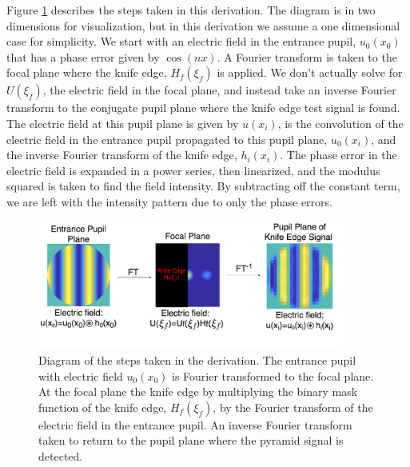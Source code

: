  Figure \ref{fig:derivationFlow} describes the steps taken in this derivation. The diagram is in two dimensions for visualization, but in this derivation we assume a one dimensional case for simplicity. We start with an electric field in the entrance pupil, $u_0(x_0)$ that has a phase error given by $\cos(nx)$. A Fourier transform is taken to the focal plane where the knife edge, $H_f(\xi_f)$ is applied. We don't actually solve for $U(\xi_f)$, the electric field in the focal plane, and instead take an inverse Fourier transform to the conjugate pupil plane where the knife edge test signal is found. The electric field at this pupil plane is given by $u(x_i)$, is the convolution of the electric field in the entrance pupil propagated to this pupil plane, $u_0(x_i)$, and the inverse Fourier transform of the knife edge, $h_i(x_i)$. The phase error in the electric field is expanded in a power series, then linearized, and the modulus squared is taken to find the field intensity. By subtracting off the constant term, we are left with the intensity pattern due to only the phase errors. 
 
 
 
 \begin{figure}
     \centering
     \includegraphics[width=0.9\textwidth]{Chapter Materials/Chapter Two Materials/DerivationFlow.png}
     \caption{Diagram of the steps taken in the derivation. The entrance pupil with electric field $u_0(x_0)$ is Fourier transformed to the focal plane. At the focal plane the knife edge by multiplying the binary mask function of the knife edge, $H_f(\xi_f)$, by the Fourier transform of the electric field in the entrance pupil. An inverse Fourier transform taken to return to the pupil plane where the pyramid signal is detected.}
     \label{fig:derivationFlow}
 \end{figure}
 
 



